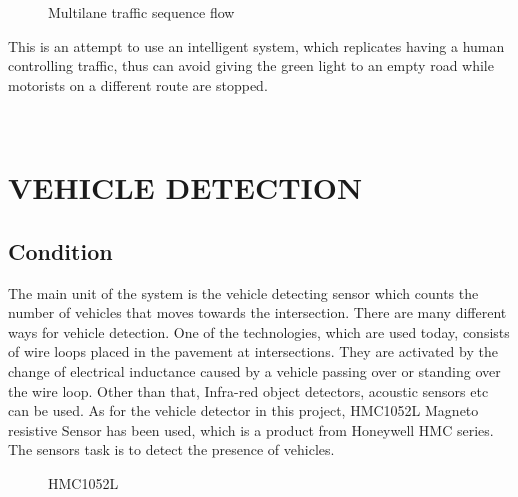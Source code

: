 \documentclass{SureshLimkar}
\begin{document}
\begin{figure}[h]%
\centering
{}%
\caption{Multilane traffic sequence flow}%
\label{Multilane traffic sequence flow}%
\end{figure}

This is an attempt to use an intelligent system, which replicates having a human controlling traffic, thus can avoid giving the green light to an empty road while motorists on a different route are stopped.

\\
\chapter{VEHICLE DETECTION}
\section{Condition}
\hspace {0.5 in}The main unit of the system is the vehicle detecting sensor which counts the number of vehicles that moves towards the intersection. There are many different ways for vehicle detection. One of the technologies, which are used today, consists of wire loops placed in the pavement at intersections. They are activated by the change of electrical inductance caused by a vehicle passing over or standing over the wire loop.  Other than that, Infra-red object detectors, acoustic sensors etc can be used.  As for the vehicle detector in this project, HMC1052L Magneto resistive Sensor has been used, which is a product from Honeywell HMC series. The sensors task is to detect the presence of vehicles.  
\begin{figure}[h]%
\centering
{}%
\caption{ HMC1052L }%
\label{HMC1052L}%
\end{figure}
\end{document}
